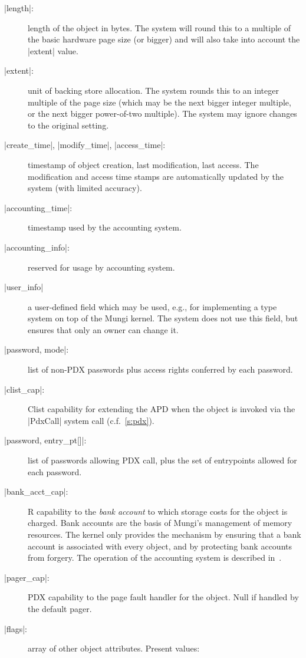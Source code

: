 \documentclass[a4paper,11pt,twoside,dvips]{report}
\begin{document}
\begin{description}
\item[|length|:] length of the object in bytes. The system will round
this to a multiple of the basic hardware page size (or bigger) and will
also take into account the |extent| value.
\item[|extent|:] unit of backing store allocation. The system rounds
this to an integer multiple of the page size (which may be the next bigger
integer multiple, or the next bigger power-of-two multiple). The system may
ignore changes to the original setting.
\item[|create\_time|, |modify\_time|, |access\_time|:] timestamp of
object creation, last modification, last access. The modification and
access time stamps are automatically updated by the system (with limited
accuracy).
\item[|accounting\_time|:] timestamp used by the accounting system.
\item[|accounting\_info|:] reserved for usage by accounting system.
\item[|user\_info|] a user-defined field which may be used, e.g., for
implementing a type system on top of the Mungi kernel. The system does
not use this field, but ensures that only an owner can change it.
\item[|password, mode|:] list of non-PDX passwords plus access rights
conferred by each password.
\item[|clist\_cap|:] Clist capability for extending the APD when the
object is invoked via the |PdxCall| system call (c.f.\ \autoref{s:pdx}).
\item[|password, entry\_pt{[]}|:] list of passwords allowing PDX call,
plus the set of entrypoints allowed for each password.
\item[|bank\_acct\_cap|:] R capability to the \emph{bank account} to
which storage costs for the object is charged. Bank accounts are the
basis of Mungi's management of memory resources. The kernel only
provides the mechanism by ensuring that a bank account is associated
with every object, and by protecting bank accounts from forgery. The
operation of the accounting system is described
in~\cite{Heiser_LR_98}.
\item[|pager\_cap|:] PDX capability to the page fault handler for the
object. Null if handled by the default pager.
\item[|flags|:] array of other object attributes. Present values:


\end{description}
\end{document}
